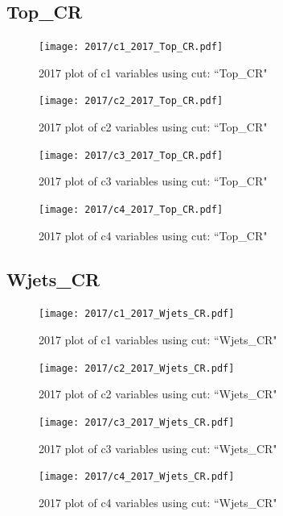 \documentclass{article}
\begin{document}
      \subsection*{Top\_CR}
                        \begin{figure}[H]
                            \centering
                            \caption{2017 plot of c1 variables using cut: ``Top\_CR"}
                            \texttt{[image: 2017/c1\_2017\_Top\_CR.pdf]}
                        \end{figure}    
                        \begin{figure}[H]
                            \centering
                            \caption{2017 plot of c2 variables using cut: ``Top\_CR"}
                            \texttt{[image: 2017/c2\_2017\_Top\_CR.pdf]}
                        \end{figure}    
                        \begin{figure}[H]
                            \centering
                            \caption{2017 plot of c3 variables using cut: ``Top\_CR"}
                            \texttt{[image: 2017/c3\_2017\_Top\_CR.pdf]}
                        \end{figure}    
                        \begin{figure}[H]
                            \centering
                            \caption{2017 plot of c4 variables using cut: ``Top\_CR"}
                            \texttt{[image: 2017/c4\_2017\_Top\_CR.pdf]}
                        \end{figure}    
      \subsection*{Wjets\_CR}
                        \begin{figure}[H]
                            \centering
                            \caption{2017 plot of c1 variables using cut: ``Wjets\_CR"}
                            \texttt{[image: 2017/c1\_2017\_Wjets\_CR.pdf]}
                        \end{figure}    
                        \begin{figure}[H]
                            \centering
                            \caption{2017 plot of c2 variables using cut: ``Wjets\_CR"}
                            \texttt{[image: 2017/c2\_2017\_Wjets\_CR.pdf]}
                        \end{figure}    
                        \begin{figure}[H]
                            \centering
                            \caption{2017 plot of c3 variables using cut: ``Wjets\_CR"}
                            \texttt{[image: 2017/c3\_2017\_Wjets\_CR.pdf]}
                        \end{figure}    
                        \begin{figure}[H]
                            \centering
                            \caption{2017 plot of c4 variables using cut: ``Wjets\_CR"}
                            \texttt{[image: 2017/c4\_2017\_Wjets\_CR.pdf]}
                        \end{figure}    
\end{document}
